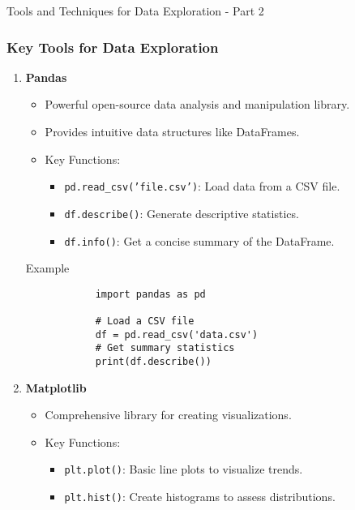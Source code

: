 \documentclass[aspectratio=169]{beamer}
\begin{document}
\begin{frame}[fragile]{Tools and Techniques for Data Exploration - Part 2}
    \frametitle{Key Tools for Data Exploration}
    \begin{enumerate}
        \item \textbf{Pandas}
            \begin{itemize}
                \item Powerful open-source data analysis and manipulation library.
                \item Provides intuitive data structures like DataFrames.
                \item Key Functions:
                \begin{itemize}
                    \item \texttt{pd.read\_csv('file.csv')}: Load data from a CSV file.
                    \item \texttt{df.describe()}: Generate descriptive statistics.
                    \item \texttt{df.info()}: Get a concise summary of the DataFrame.
                \end{itemize}
            \end{itemize}

            \begin{block}{Example}
            \begin{lstlisting}
            import pandas as pd

            # Load a CSV file
            df = pd.read_csv('data.csv')
            # Get summary statistics
            print(df.describe())
            \end{lstlisting}
            \end{block}

        \item \textbf{Matplotlib}
            \begin{itemize}
                \item Comprehensive library for creating visualizations.
                \item Key Functions:
                \begin{itemize}
                    \item \texttt{plt.plot()}: Basic line plots to visualize trends.
                    \item \texttt{plt.hist()}: Create histograms to assess distributions.
                \end{itemize}
            \end{itemize}


\end{enumerate}
\end{frame}
\end{document}

